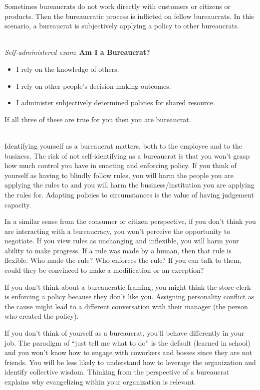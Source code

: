 Sometimes bureaucrats do not work directly with customers or citizens or products. Then the bureaucratic process is inflicted on fellow bureaucrats. In this scenario, a bureaucrat is subjectively applying a policy to other bureaucrats. 

\ \\
\textit{Self-administered exam}: 
\textbf{Am I a Bureaucrat?}
\begin{itemize}
    \item I rely on the knowledge of others.
    \item I rely on other people's decision making outcomes.
    \item I administer subjectively determined policies for shared resource.
\end{itemize}
If all three of these are true for you then you are bureaucrat.


\ \\

Identifying yourself as a bureaucrat matters, both to the employee and to the business. The risk of not self-identifying as a bureaucrat is that you won't grasp how much control you have in enacting and enforcing policy. If you think of yourself as having to blindly follow rules, you will harm the people you are applying the rules to and you will harm the business/institution you are applying the rules for. Adapting policies to circumstances is the value of having judgement capacity. 

In a similar sense from the consumer or citizen perspective, if you don't think you are interacting with a bureaucracy, you won't perceive the opportunity to negotiate.  If you view rules as unchanging and inflexible, you will harm your ability to make progress. If a rule was made by a human, then that rule is flexible. Who made the rule? Who enforces the rule? If you can talk to them, could they be convinced to make a modification or an exception?

If you don't think about a bureaucratic framing, you might think the store clerk is enforcing a policy because they don't like you. Assigning personality conflict as the cause might lead to a different conversation with their manager (the person who created the policy). 

If you don't think of yourself as a bureaucrat, you'll behave differently in your job. The paradigm of ``just tell me what to do'' is the default (learned in school) and you won't know how to engage with coworkers and bosses since they are not friends. You will be less likely to understand how to leverage the organization and identify collective wisdom. Thinking from the perspective of a bureaucrat explains why evangelizing within your organization is relevant. 

